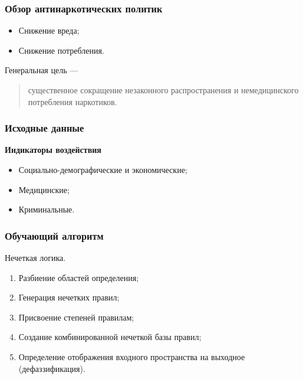 \documentclass[t]{beamer}  %
\begin{document}
\begin{frame}
    \frametitle{Обзор антинаркотических политик}%
	\begin{itemize}
        \item Снижение вреда;
        \item Снижение потребления.
	\end{itemize}
    Генеральная цель ---
    \begin{quote}
        существенное сокращение незаконного распространения и немедицинского 
        потребления наркотиков. 
    \end{quote}
\end{frame}
\begin{frame}
    \frametitle{Исходные данные}
    \textbf{Индикаторы воздействия}
    \begin{itemize}
    \item Социально-демографические и экономические;
    \item Медицинские;
    \item Криминальные.
    \end{itemize}
\end{frame}
\begin{frame}
    \frametitle{Обучающий алгоритм} 
	\begin{block}{Нечеткая логика. }
        \begin{enumerate}
            \item Разбиение областей определения;
            \item Генерация нечетких правил;
            \item Присвоение степеней правилам;
            \item Создание комбинированной нечеткой базы правил;
            \item Определение отображения входного пространства на выходное
                (дефаззификация).
        \end{enumerate}
	\end{block}

\end{frame}
\end{document}

